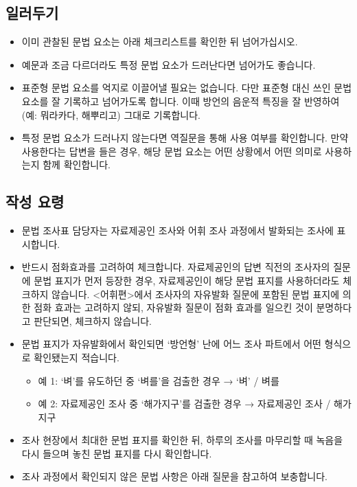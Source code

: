 
\subsection{일러두기}
\begin{itemize}[noitemsep]
  \item 이미 관찰된 문법 요소는 아래 체크리스트를 확인한 뒤 넘어가십시오.
  \item 예문과 조금 다르더라도 특정 문법 요소가 드러난다면 넘어가도 좋습니다.
  \item 표준형 문법 요소를 억지로 이끌어낼 필요는 없습니다. 다만 표준형 대신 쓰인 문법 요소를 잘 기록하고 넘어가도록 합니다. 이때 방언의 음운적 특징을 잘 반영하여(예: 뭐라카다, 해뿌리고) 그대로 기록합니다.
  \item 특정 문법 요소가 드러나지 않는다면 역질문을 통해 사용 여부를 확인합니다. 만약 사용한다는 답변을 들은 경우, 해당 문법 요소는 어떤 상황에서 어떤 의미로 사용하는지 함께 확인합니다.
\end{itemize}

\subsection{작성 요령}
\begin{itemize}[noitemsep]
  \item 문법 조사표 담당자는 자료제공인 조사와 어휘 조사 과정에서 발화되는 조사에 표시합니다.
  \item 반드시 점화효과를 고려하여 체크합니다. 자료제공인의 답변 직전의 조사자의 질문에 문법 표지가 먼저 등장한 경우, 자료제공인이 해당 문법 표지를 사용하더라도 체크하지 않습니다. <어휘편>에서 조사자의 자유발화 질문에 포함된 문법 표지에 의한 점화 효과는 고려하지 않되, 자유발화 질문이 점화 효과를 일으킨 것이 분명하다고 판단되면, 체크하지 않습니다. 
  \item 문법 표지가 자유발화에서 확인되면 `방언형' 난에 어느 조사 파트에서 어떤 형식으로 확인됐는지 적습니다.
    \begin{itemize}[noitemsep]
      \item 예 1: `벼'를 유도하던 중 `벼를'을 검출한 경우 → `벼' / 벼를
      \item 예 2: 자료제공인 조사 중 `해가지구'를 검출한 경우 → 자료제공인 조사 / 해가지구
    \end{itemize}
  \item 조사 현장에서 최대한 문법 표지를 확인한 뒤, 하루의 조사를 마무리할 때 녹음을 다시 들으며 놓친 문법 표지를 다시 확인합니다.
  \item 조사 과정에서 확인되지 않은 문법 사항은 아래 질문을 참고하여 보충합니다.
\end{itemize}

